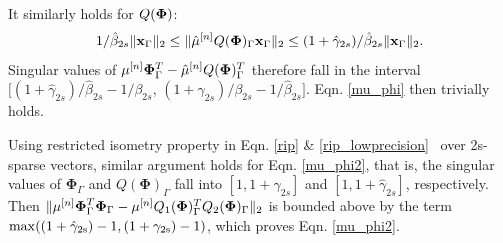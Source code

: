 \documentclass{article}
\begin{document}
It similarly holds for $Q(\boldsymbol{{\bf \Phi}})$:
\begin{equation}
\begin{aligned}
   1/\hat{\beta}_{2s} \| {\bf x}_{\Gamma}\|_2\leq \|{\hat{\mu}}^{[n]}Q({\bf {\bf \Phi}})_{\Gamma} {\bf x}_{\Gamma}\|_2\leq (1+\hat{\gamma}_{2s})/\hat{\beta}_{2s}\| {\bf x}_{\Gamma}\|_2.
\end{aligned}
\end{equation}
Singular values of ${\mu}^{[n]}{\bf {\bf \Phi}}_{\Gamma}^T-\hat{\mu}^{[n]}Q({\bf {\bf \Phi}})_{\Gamma}^T$ therefore fall in the interval $[({1+\hat{\gamma}_{2s}})/{\hat{\beta}_{2s}}-{1}/{\beta_{2s}}$, $({1+\gamma_{2s}})/{\beta_{2s}}-{1}/{\hat{\beta}_{2s}}]$. Eqn. \ref{mu_phi} then trivially holds.

Using restricted isometry property in Eqn. \ref{rip} \& \ref{rip_lowprecision} \  over 2s-sparse vectors, similar argument holds for Eqn. \ref{mu_phi2}, that is, the singular values of $\boldsymbol{\Phi}_{\Gamma}$ and $Q(\boldsymbol{\Phi})_{\Gamma}$ fall into $[1, 1+ \gamma_{2s}]$ and $[1, 1+ \hat{\gamma}_{2s}]$, respectively. Then $\|\mu^{[n]}\boldsymbol{\Phi}_{\Gamma}^T\boldsymbol{{\bf \Phi}}_{\Gamma} - \mu^{[n]}Q_1(\boldsymbol{\Phi})_{\Gamma}^TQ_2(\boldsymbol{\Phi})_{\Gamma}\|_2$ is bounded above by the term $\rm{max}((1+\hat{\gamma}_{2s})-1, (1+\gamma_{2s})-1)$, which proves Eqn. \ref{mu_phi2}. 
\end{document}
